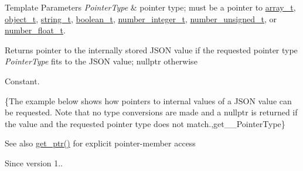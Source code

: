 \begin{DoxyTemplParams}{Template Parameters}
{\em Pointer\+Type} & pointer type; must be a pointer to \hyperlink{classnlohmann_1_1basic__json_a53700c308d804f84aea5ff05abb2ac4e}{array\+\_\+t}, \hyperlink{classnlohmann_1_1basic__json_a5e3df077f880583a96d74cd63e173cb2}{object\+\_\+t}, \hyperlink{classnlohmann_1_1basic__json_a33593865ffb1860323dcbd52425b90c8}{string\+\_\+t}, \hyperlink{classnlohmann_1_1basic__json_a44fd1a12c9c54623c942b430e7a72937}{boolean\+\_\+t}, \hyperlink{classnlohmann_1_1basic__json_a11e390944da90db83089eb2426a749d3}{number\+\_\+integer\+\_\+t}, \hyperlink{classnlohmann_1_1basic__json_ae09af9c23351b7245d9be4d1b2035fef}{number\+\_\+unsigned\+\_\+t}, or \hyperlink{classnlohmann_1_1basic__json_a5b8abaebd922d82d69756327c0c347e6}{number\+\_\+float\+\_\+t}.\\
\hline
\end{DoxyTemplParams}
\begin{DoxyReturn}{Returns}
pointer to the internally stored J\+S\+ON value if the requested pointer type {\itshape Pointer\+Type} fits to the J\+S\+ON value; {\ttfamily nullptr} otherwise
\end{DoxyReturn}
Constant.

\{The example below shows how pointers to internal values of a J\+S\+ON value can be requested. Note that no type conversions are made and a {\ttfamily nullptr} is returned if the value and the requested pointer type does not match.,get\+\_\+\+\_\+\+Pointer\+Type\}

\begin{DoxySeeAlso}{See also}
\hyperlink{classnlohmann_1_1basic__json_ae5aa126de247d34c5b4395836d05f044}{get\+\_\+ptr()} for explicit pointer-\/member access
\end{DoxySeeAlso}
\begin{DoxySince}{Since}
version 1.. 
\end{DoxySince}
